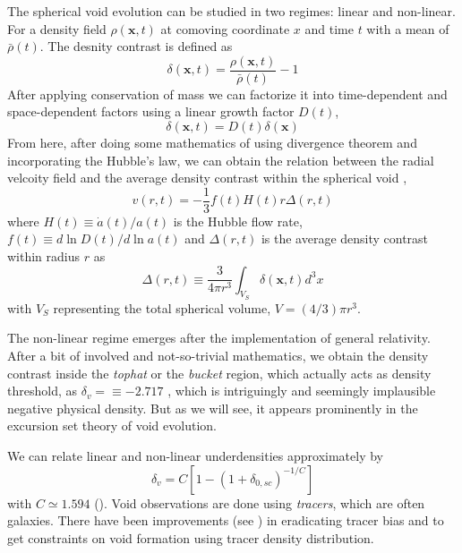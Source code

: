 \documentclass[fleqn,usenatbib]{mnras}
\begin{document}
The spherical void evolution can be studied in two regimes: linear and non-linear. For a density field $ \rho (\textbf{x}, t) $ at comoving coordinate $ x $ and time $ t $ with a mean of $ \bar{\rho}(t) $. The desnity contrast is defined as
\begin{equation}\label{key}
	\delta (\textbf{x}, t) = \dfrac{\rho (\textbf{x}, t)}{\bar{\rho}(t)} -1
\end{equation}
After applying conservation of mass we can factorize  it into time-dependent and space-dependent factors using a linear growth factor $ D(t) $,
\begin{equation}\label{key}
	\delta (\textbf{x}, t) = D(t) \delta (\textbf{x})
\end{equation}
From here, after doing some mathematics of using divergence theorem and incorporating the Hubble's law, we can obtain the relation between the radial velcoity field and the average density contrast within the spherical void \citep{peebles_large-scale_1980},
\begin{equation}\label{key}
	v(r, t) =-\dfrac{1}{3} f(t) H(t) r \Delta (r, t)
\end{equation}
where $ H(t) \equiv \dot{a} (t)/a(t) $ is the Hubble flow rate, $ f(t) \equiv d \ln D(t)/d \ln a(t) $ and $ \Delta  (r, t)$ is the average density contrast within radius $ r $ as 
\begin{equation}\label{key}
	\Delta (r, t) \equiv \dfrac{3}{4 \pi r^3} \int_{V_S} \delta (\textbf{x}, t) d^3x
\end{equation}
with $ V_S $ representing the total spherical volume, $ V = (4/3) \pi r^3 $.

The non-linear regime emerges after the implementation of general relativity. After a bit of involved and not-so-trivial mathematics, we obtain the density contrast inside the \textit{tophat} or the \textit{bucket} region, which actually acts as density threshold, as $ \delta_v = \equiv -2.717 $ \citep{hamaus_universitats-sternwarte_2017}, which is intriguingly and seemingly implausible negative physical density. But as we will see, it appears prominently in the excursion set theory of void evolution.

We can relate linear and non-linear underdensities approximately by
\begin{equation}\label{key}
	\delta_v = C [1-(1+\delta_{0,sc})^{-1/C}]
\end{equation}
with $ C \simeq 1.594 $ (\citep{bernardeau_nonlinear_1994}). Void observations are done using \textit{tracers}, which are often galaxies. There have been improvements (see \cite{pollina_linearity_2017, ronconi_cosmological_2017}) in eradicating tracer bias and to get constraints on void formation using tracer density distribution.
\end{document}
